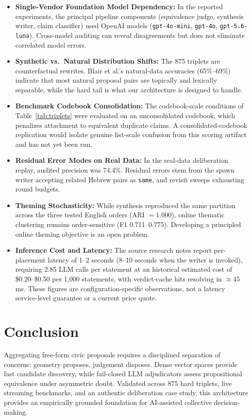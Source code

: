 \documentclass[11pt,a4paper]{article}
\begin{document}
\begin{itemize}
\item \textbf{Single-Vendor Foundation Model Dependency:} In the reported experiments, the principal pipeline components (equivalence judge, synthesis writer, claim classifier) used OpenAI models (\texttt{gpt-4o-mini}, \texttt{gpt-4o}, \texttt{gpt-5.6-luna}). Cross-model auditing can reveal disagreements but does not eliminate correlated model errors.
\item \textbf{Synthetic vs.\ Natural Distribution Shifts:} The 875 triplets are counterfactual rewrites. Blair et al.'s natural-data accuracies (65\%--69\%) indicate that most natural proposal pairs are topically and lexically separable, while the hard tail is what our architecture is designed to handle.
\item \textbf{Benchmark Codebook Consolidation:} The codebook-scale conditions of Table~\ref{tab:triplets} were evaluated on an unconsolidated codebook, which penalizes attachment to equivalent duplicate claims. A consolidated-codebook replication would isolate genuine list-scale confusion from this scoring artifact and has not yet been run.
\item \textbf{Residual Error Modes on Real Data:} In the real-data deliberation replay, audited precision was 74.4\%. Residual errors stem from the spawn writer accepting related Hebrew pairs as \texttt{same}, and revisit sweeps exhausting round budgets.
\item \textbf{Theming Stochasticity:} While synthesis reproduced the same partition across the three tested English orders (ARI $=1.000$), online thematic clustering remains order-sensitive (F1 0.711--0.775). Developing a principled online theming objective is an open problem.
\item \textbf{Inference Cost and Latency:} The source research notes report per-placement latency of 1--2 seconds (8--10 seconds when the writer is invoked), requiring 2.85 LLM calls per statement at an historical estimated cost of \$0.20--\$0.50 per 1,000 statements, with verdict-cache hits resolving in $\approx 45$\,ms. These figures are configuration-specific observations, not a latency service-level guarantee or a current price quote.
\end{itemize}

\section{Conclusion}

Aggregating free-form civic proposals requires a disciplined separation of concerns: geometry proposes, judgement disposes. Dense vector spaces provide fast candidate discovery, while fail-closed LLM adjudicators assess propositional equivalence under asymmetric doubt. Validated across 875 hard triplets, live streaming benchmarks, and an authentic deliberation case study, this architecture provides an empirically grounded foundation for AI-assisted collective decision-making.
\end{document}

